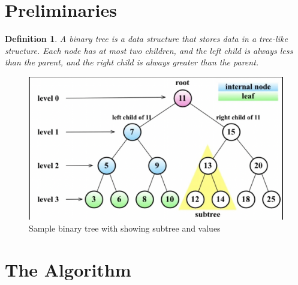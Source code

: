 \documentclass[12pt]{article}
\newtheorem{Definition}{Definition}
\begin{document}
\section{Preliminaries}
\begin{Definition}
    A binary tree is a data structure that stores data in a tree-like structure.
    Each node has at most two children, and the left child is always less than the parent, and the right child is always greater than the parent.
\end{Definition}
\begin{figure}[h!]
    \centering
    \includegraphics[scale=.6]{images/termen.png}
    \caption{Sample binary tree with showing subtree and values}
\end{figure}

\section{The Algorithm}
\end{document}
